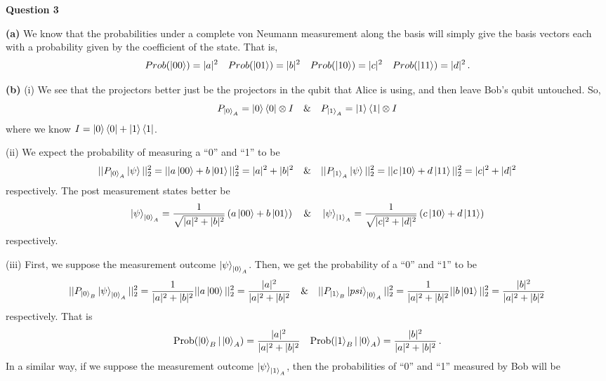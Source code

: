 \documentclass[10pt]{article}
\begin{document}
\newpage
\textbf{Question 3}

\textbf{(a)} We know that the probabilities under a complete von Neumann measurement along the basis will simply give the basis vectors each with a probability given by the coefficient of the state. That is,
\[ Prob(\ket{00}) = |a|^{2} \quad Prob(\ket{01}) = |b|^{2} \quad Prob(\ket{10}) = |c|^{2} \quad Prob(\ket{11}) = |d|^{2} \, .\]

\textbf{(b)} (i) We see that the projectors better just be the projectors in the qubit that Alice is using, and then leave Bob's qubit untouched. So,
\[ P_{\ket{0}_{A}} = \ket{0}\bra{0} \otimes I \quad \& \quad P_{\ket{1}_{A}} = \ket{1}\bra{1} \otimes I \]
where we know $I = \ket{0}\bra{0} + \ket{1}\bra{1}$.

(ii) We expect the probability of measuring a ``0'' and ``1'' to be
\[ ||P_{\ket{0}_{A}}\ket{\psi}||_{2}^{2} = ||a\ket{00} + b\ket{01}||^{2}_{2} = |a|^{2} + |b|^{2} \quad \& \quad
||P_{\ket{1}_{A}}\ket{\psi}||_{2}^{2} = ||c\ket{10} + d\ket{11}||^{2}_{2} = |c|^{2} + |d|^{2}\]
respectively. The post measurement states better be
\[ \ket{\psi}_{\ket{0}_{A}} = \frac{1}{\sqrt{|a|^{2} + |b|^{2}}}\left(a\ket{00} + b\ket{01}\right) \quad \& \quad \ket{\psi}_{\ket{1}_{A}} = \frac{1}{\sqrt{|c|^{2} + |d|^{2}}}\left(c\ket{10} + d\ket{11}\right) \]
respectively.

(iii) First, we suppose the measurement outcome $\ket{\psi}_{\ket{0}_{A}}$. Then, we get the probability of a ``0'' and ``1'' to be
\[ ||P_{\ket{0}_{B}}\ket{\psi}_{\ket{0}_{A}}||_{2}^{2} = \frac{1}{|a|^{2}+|b|^{2}}||a\ket{00}||_{2}^{2} = \frac{|a|^{2}}{|a|^{2}+|b|^{2}} \quad \& \quad ||P_{\ket{1}_{B}}\ket{psi}_{\ket{0}_{A}}||_{2}^{2} = \frac{1}{|a|^{2}+|b|^{2}}||b\ket{01}||_{2}^{2} = \frac{|b|^{2}}{|a|^{2}+|b|^{2}}\]
respectively. That is
\[\text{Prob}(\ket{0}_{B}|\ket{0}_{A}) = \frac{|a|^{2}}{|a|^{2}+|b|^{2}} \quad \text{Prob}(\ket{1}_{B}|\ket{0}_{A}) = \frac{|b|^{2}}{|a|^{2}+|b|^{2}} \, .\]
In a similar way, if we suppose the measurement outcome $\ket{\psi}_{\ket{1}_{A}}$, then the probabilities of ``0'' and ``1'' measured by Bob will be
\end{document}
